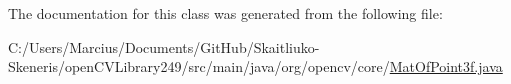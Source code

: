 The documentation for this class was generated from the following file\+:\begin{DoxyCompactItemize}
\item 
C\+:/\+Users/\+Marcius/\+Documents/\+Git\+Hub/\+Skaitliuko-\/\+Skeneris/open\+C\+V\+Library249/src/main/java/org/opencv/core/\mbox{\hyperlink{_mat_of_point3f_8java}{Mat\+Of\+Point3f.\+java}}\end{DoxyCompactItemize}
